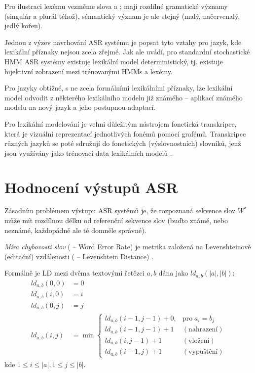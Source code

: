 Pro ilustraci lexému vezměme slova  a ; mají rozdílné gramatické významy (singulár a plurál téhož), sémantický význam je ale stejný (malý, načervenalý, jedlý kořen). 

Jednou z výzev navrhování ASR systému je popsat tyto vztahy pro jazyk, kde lexikální příznaky nejsou zcela zřejmé. Jak ale \cite{rasipuram_2014} uvádí, pro standardní stochastické HMM ASR systémy existuje lexikální model deterministický, tj. existuje bijektivní zobrazení mezi trénovanými HMMs a lexémy.

Pro jazyky obtížné, s ne zcela formálními lexikálními příznaky, lze lexikální model odvodit z některého lexikálního modelu již známého -- aplikací známého modelu na nový jazyk a jeho postupnou adaptací.

Pro lexikální modelování je velmi důležitým nástrojem fonetická transkripce, která je vizuální reprezentací jednotlivých fonémů pomocí grafémů. Transkripce různých jazyků se poté sdružují do fonetických (výslovnostních) slovníků, jenž jsou využívány jako trénovací data lexikálních modelů \cite{haili_2013}. 

\section{Hodnocení výstupů ASR}

Zásadním problémem výstupu ASR systémů je, že rozpoznaná sekvence slov $W^*$ může mít rozdílnou délku od referenční sekvence slov (buďto známé, nebo neznámé, každopádně ale té domněle správné). 

{\sl Míra chybovosti slov} ( -- Word Error Rate) je metrika založená na Levenshteinově (editační) vzdálenosti ( -- Levenshtein Distance) \cite{schluter_2010}.

Formálně je LD mezi dvěma textovými řetězci $a, b$ dána jako $ld_{a,b}(|a|,|b|)$:
%
\begin{align}
	\label{eq:ld}
	ld_{a,b}(0,0) &= 0\\
	ld_{a,b}(i,0) &= i\\
	ld_{a,b}(0,j) &= j\\
	ld_{a,b}(i,j) &= 
	\min
	\begin{cases}
		ld_{a,b}(i-1,j-1)+0, & \text{pro}\;a_i = b_j \\
		ld_{a,b}(i-1,j-1)+1  & (\text{nahrazení}) \\
		ld_{a,b}(i,j-1)+1    & (\text{vložení}) \\
		ld_{a,b}(i-1,j)+1    & (\text{vypuštění})
	\end{cases}
\end{align}
%
kde $1 \le i \le |a|, 1 \le j \le |b|$.


